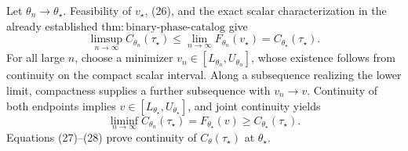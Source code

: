 Let \(\theta_n\to\theta_\star\).  Feasibility of \(v_\star\), (26), and the exact scalar characterization in the already established \(\mathrm{thm{:}binary\mbox{-}phase\mbox{-}catalog}\) give
\[
\limsup_{n\to\infty}C_{\theta_n}(\tau_\star)
\leq\lim_{n\to\infty}F_{\theta_n}(v_\star)
=C_{\theta_\star}(\tau_\star).
\tag{27}
\]
For all large \(n\), choose a minimizer \(v_n\in[L_{\theta_n},U_{\theta_n}]\), whose existence follows from continuity on the compact scalar interval.  Along a subsequence realizing the lower limit, compactness supplies a further subsequence with \(v_n\to v\).  Continuity of both endpoints implies \(v\in[L_{\theta_\star},U_{\theta_\star}]\), and joint continuity yields
\[
\liminf_{n\to\infty}C_{\theta_n}(\tau_\star)
=F_{\theta_\star}(v)
\geq C_{\theta_\star}(\tau_\star).
\tag{28}
\]
Equations (27)--(28) prove continuity of \(C_\theta(\tau_\star)\) at \(\theta_\star\).

